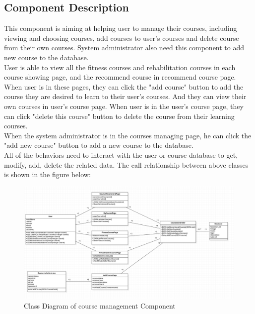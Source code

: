 \documentclass[16pt]{scrreprt}
\begin{document}
\subsection{Component Description}
This component is aiming at helping user to manage their courses, including viewing and choosing courses, add courses to user's courses and delete course from their own courses. System administrator also need this component to add new course to the database.\\

\noindent User is able to view all the fitness courses and rehabilitation courses in each course showing page, and the recommend course in recommend course page. When user is in these pages, they can click the "add course" button to add the course they are desired to learn to their user's courses. And they can view their own courses in user's course page. When user is in the user's course page, they can click "delete this course" button to delete the course from their learning courses.\\

\noindent When the system administrator is in the courses managing page, he can click the "add new course" button to add a new course to the database.\\

\noindent All of the behaviors need to interact with the user or course database to get, modify, add, delete the related data. The call relationship between above classes is shown in the figure below:
\begin{figure}[H]
	\centering
	\includegraphics[width=1.0\textwidth]{diagrams/course-module-diagram.png}
	\caption{Class Diagram of course management Component}
\end{figure}
\end{document}
